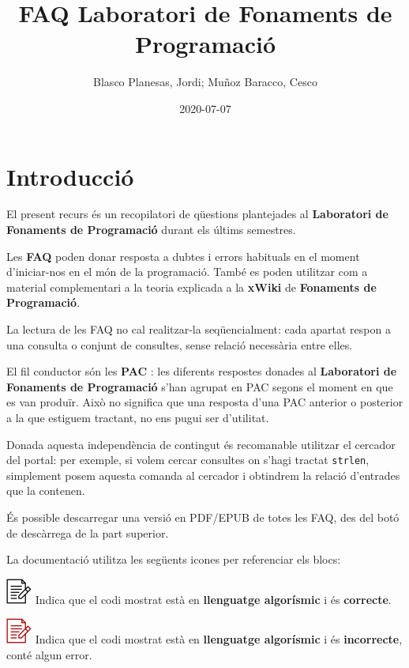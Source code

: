 \documentclass[
]{book}
\title{FAQ Laboratori de Fonaments de Programació}
\author{Blasco Planesas, Jordi; Muñoz Baracco, Cesco}
\date{2020-07-07}
\begin{document}
\frontmatter
\maketitle

{
\setcounter{tocdepth}{1}
\tableofcontents
}
\mainmatter
\hypertarget{introducciuxf3}{%
\chapter*{Introducció}\label{introducciuxf3}}

El present recurs és un recopilatori de qüestions plantejades al \textbf{Laboratori de Fonaments de Programació} durant els últims semestres.

Les \textbf{FAQ} poden donar resposta a dubtes i errors habituals en el moment d'iniciar-nos en el món de la programació. També es poden utilitzar com a material complementari a la teoria explicada a la \textbf{xWiki} de \textbf{Fonaments de Programació}.

La lectura de les FAQ no cal realitzar-la seqüencialment: cada apartat respon a una consulta o conjunt de consultes, sense relació necessària entre elles.

El fil conductor són les \textbf{PAC} : les diferents respostes donades al \textbf{Laboratori de Fonaments de Programació} s'han agrupat en PAC segons el moment en que es van produïr. Això no significa que una resposta d'una PAC anterior o posterior a la que estiguem tractant, no ens pugui ser d'utilitat.

Donada aquesta independència de contingut és recomanable utilitzar el cercador del portal: per exemple, si volem cercar consultes on s'hagi tractat \texttt{strlen}, simplement posem aquesta comanda al cercador i obtindrem la relació d'entrades que la contenen.

És possible descarregar una versió en PDF/EPUB de totes les FAQ, des del botó de descàrrega de la part superior.

La documentació utilitza les següents icones per referenciar els blocs:

\includegraphics{./img/alg.png} Indica que el codi mostrat està en \textbf{llenguatge algorísmic} i és \textbf{correcte}.

\includegraphics{./img/alg_err.png} Indica que el codi mostrat està en \textbf{llenguatge algorísmic} i és \textbf{incorrecte}, conté algun error.
\end{document}
